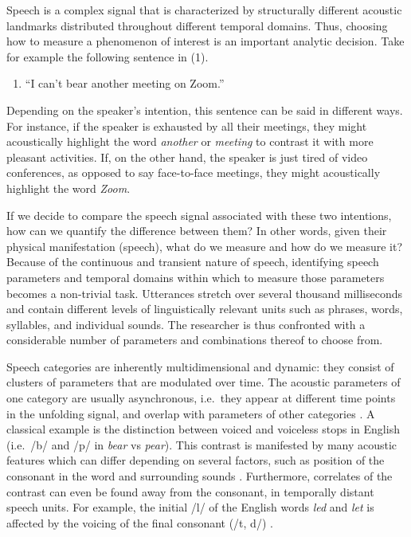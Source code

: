 \documentclass[Review,times,sageh]{sagej}
\providecommand{\tightlist}{\setlength{\itemsep}{0pt}\setlength{\parskip}{0pt}}
\begin{document}
Speech is a complex signal that is characterized by structurally different acoustic landmarks distributed throughout different temporal domains.
Thus, choosing how to measure a phenomenon of interest is an important analytic decision.
Take for example the following sentence in (1).

\vspace{1em}

\begin{enumerate}
\def\labelenumi{(\arabic{enumi})}
\tightlist
\item
  ``I can't bear another meeting on Zoom.''
  \vspace{1em}
\end{enumerate}

Depending on the speaker's intention, this sentence can be said in different ways.
For instance, if the speaker is exhausted by all their meetings, they might acoustically highlight the word \emph{another} or \emph{meeting} to contrast it with more pleasant activities.
If, on the other hand, the speaker is just tired of video conferences, as opposed to say face-to-face meetings, they might acoustically highlight the word \emph{Zoom}.

If we decide to compare the speech signal associated with these two intentions, how can we quantify the difference between them?
In other words, given their physical manifestation (speech), what do we measure and how do we measure it?
Because of the continuous and transient nature of speech, identifying speech parameters and temporal domains within which to measure those parameters becomes a non-trivial task.
Utterances stretch over several thousand milliseconds and contain different levels of linguistically relevant units such as phrases, words, syllables, and individual sounds.
The researcher is thus confronted with a considerable number of parameters and combinations thereof to choose from.

Speech categories are inherently multidimensional and dynamic: they consist of clusters of parameters that are modulated over time.
The acoustic parameters of one category are usually asynchronous, i.e.~they appear at different time points in the unfolding signal, and overlap with parameters of other categories \citep[e.g.~][]{jongman2000acoustic, lisker1986voicing, summerfield1981articulatory, winter2014spoken}.
A classical example is the distinction between voiced and voiceless stops in English (i.e.~/b/ and /p/ in \emph{bear} vs \emph{pear}).
This contrast is manifested by many acoustic features which can differ depending on several factors, such as position of the consonant in the word and surrounding sounds \citep{lisker1977rapid}.
Furthermore, correlates of the contrast can even be found away from the consonant, in temporally distant speech units.
For example, the initial /l/ of the English words \emph{led} and \emph{let} is affected by the voicing of the final consonant (/t, d/) \citep{hawkins2004influence}.
\end{document}
